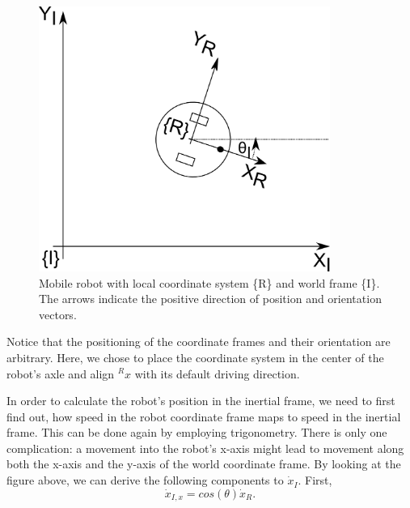 \begin{figure}[htb!]
	\centering
		\includegraphics[width=0.85\textwidth]{figs/mobilerobot.png}
	\caption{Mobile robot with local coordinate system \{R\} and world frame \{I\}. The arrows indicate the positive direction of position and orientation vectors.}
	\label{fig:mobilerobot}
\end{figure}



Notice that the positioning of the coordinate frames and their orientation are arbitrary. Here, we chose to place the coordinate system in the center of the robot's axle and align $^Rx$ with its default driving direction.

In order to calculate the robot's position in the inertial frame, we need to first find out, how speed in the robot coordinate frame maps to speed in the inertial frame. This can be done again by employing trigonometry. There is only one complication: a movement into the robot's x-axis might lead to movement along both the x-axis and the y-axis of the world coordinate frame. By looking at the figure above, we can derive the following components to $\dot{x}_I$. First, 
\begin{equation}
\dot{x}_{I,x}=cos(\theta) \dot{x}_R.
\end{equation}

